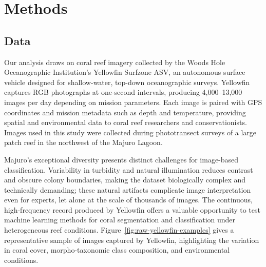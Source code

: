 \documentclass[11pt]{elsarticle}
\begin{document}
\section{Methods}
\subsection{Data}
\label{sec:data}

Our analysis draws on coral reef imagery collected by the Woods Hole Oceanographic Institution's Yellowfin Surfzone ASV, an autonomous surface vehicle designed for shallow-water, top-down oceanographic surveys. Yellowfin captures RGB photographs at one-second intervals, producing 4,000--13,000 images per day depending on mission parameters. Each image is paired with GPS coordinates and mission metadata such as depth and temperature, providing spatial and environmental data to coral reef researchers and conservationists. Images used in this study were collected during phototransect surveys of a large patch reef in the northwest of the Majuro Lagoon.

Majuro's exceptional diversity presents distinct challenges for image-based classification. Variability in turbidity and natural illumination reduces contrast and obscure colony boundaries, making the dataset biologically complex and technically demanding; these natural artifacts complicate image interpretation even for experts, let alone at the scale of thousands of images. The continuous, high-frequency record produced by Yellowfin offers a valuable opportunity to test machine learning methods for coral segmentation and classification under heterogeneous reef conditions. Figure~\ref{fig:raw-yellowfin-examples} gives a representative sample of images captured by Yellowfin, highlighting the variation in coral cover, morpho-taxonomic class composition, and environmental conditions.
\end{document}
